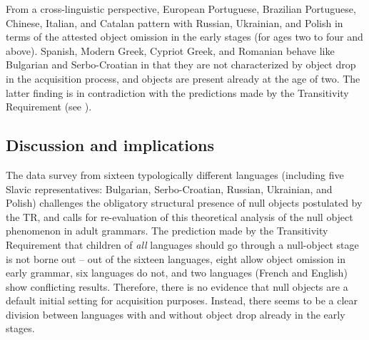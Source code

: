 \documentclass[output=paper,
modfonts,
newtxmath,
hidelinks,
]{langscibook}
\begin{document}
From a cross-linguistic perspective, European Portuguese, Brazilian Portuguese, Chinese, Italian, and Catalan pattern with Russian, Ukrainian, and Polish in terms of the attested object omission in the early stages (for ages two to four and above). Spanish, Modern Greek, Cypriot Greek, and Romanian behave like Bulgarian and Serbo-Croatian in that they are not characterized by object drop in the acquisition process, and objects are present already at the age of two. The latter finding is in contradiction with the predictions made by the Transitivity Requirement (see ).

\subsection{Discussion and implications}\label{sec:key:3.3}

The data survey from sixteen typologically different languages (including five Slavic representatives: Bulgarian, Serbo-Croatian, Russian, Ukrainian, and Polish) challenges the obligatory structural presence of null objects postulated by the TR, and calls for re-evaluation of this theoretical analysis of the null object phenomenon in adult grammars. The prediction made by the Transitivity Requirement that children of \textit{all} languages should go through a null-object stage is not borne out -- out of the sixteen languages, eight allow object omission in early grammar, six languages do not, and two languages (French and English) show conflicting results. Therefore, there is no evidence that null objects are a default initial setting for acquisition purposes. Instead, there seems to be a clear division between languages with and without object drop already in the early stages.
\end{document}

